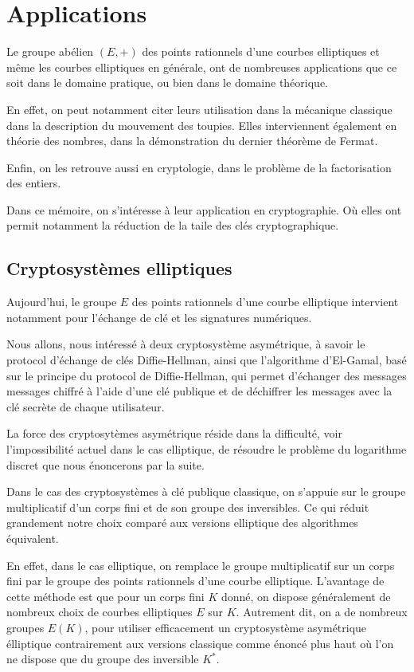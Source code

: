 \chapter{Applications}
Le groupe abélien $(E,+)$ des points rationnels d'une courbes elliptiques et même les courbes elliptiques en générale,
ont de nombreuses applications que ce soit dans le domaine pratique, ou bien dans le domaine
théorique.

En effet, on peut notamment citer leurs utilisation dans la mécanique classique dans la
description du mouvement des toupies. Elles interviennent également en théorie des nombres, dans la démonstration
du dernier théorème de Fermat.

Enfin, on les retrouve aussi en cryptologie, dans le problème de la factorisation des entiers.

Dans ce mémoire, on s'intéresse à leur application en cryptographie. Où elles ont
permit notamment la réduction de la taile des clés cryptographique.

\section{Cryptosystèmes elliptiques}

Aujourd'hui, le groupe $E$ des points rationnels d'une courbe elliptique intervient notamment pour l'échange de clé
et les signatures numériques.

Nous allons, nous intéressé à deux cryptosystème asymétrique, à savoir le protocol d'échange de
clés Diffie-Hellman, ainsi que l'algorithme d'El-Gamal, basé sur le principe du protocol de
Diffie-Hellman, qui permet d'échanger des messages messages chiffré à l'aide d'une clé
publique et de déchiffrer les messages avec la clé secrète de chaque utilisateur.

La force des cryptosytèmes asymétrique réside dans la difficulté, voir l'impossibilité actuel dans le cas elliptique, de résoudre le problème du logarithme discret que nous énoncerons par la suite.

Dans le cas des cryptosystèmes à clé publique classique, on s'appuie sur le groupe multiplicatif d'un corps fini et de son groupe des inversibles. Ce qui réduit grandement notre choix comparé aux versions elliptique des algorithmes équivalent.

En effet, dans le cas elliptique, on remplace le groupe multiplicatif sur un corps fini par le groupe des points rationnels d'une courbe elliptique. L'avantage de cette méthode est que pour un corps fini  $K$ donné, on dispose généralement de nombreux choix de courbes elliptiques $E$ sur $K$. Autrement dit, on a de nombreux groupes $E(K)$, pour utiliser efficacement un cryptosystème asymétrique élliptique contrairement aux versions classique comme énoncé plus haut où
l'on ne dispose que du groupe des inversible $K^{*}$.

